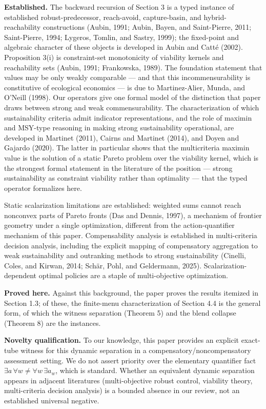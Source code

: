 \documentclass[review,11pt]{elsarticle}
\begin{document}
\textbf{Established.} The backward recursion of Section 3 is
a typed instance of established robust-predecessor, reach-avoid,
capture-basin, and hybrid-reachability constructions (Aubin, 1991;
Aubin, Bayen, and Saint-Pierre, 2011; Saint-Pierre, 1994; Lygeros,
Tomlin, and Sastry, 1999); the fixed-point and algebraic character of these objects is developed in Aubin and Catt\'e (2002). Proposition 3(i) is constraint-set
monotonicity of viability kernels and reachability sets (Aubin, 1991;
Frankowska, 1989). The foundation statement that values may be only
weakly comparable --- and that this incommensurability is constitutive
of ecological economics --- is due to Martinez-Alier, Munda, and O'Neill
(1998). Our operators give one formal model of the distinction that
paper draws between strong and weak commensurability. The
characterization of which sustainability criteria admit indicator
representations, and the role of maximin and MSY-type reasoning in
making strong sustainability operational, are developed in Martinet
(2011), Cairns and Martinet (2014), and Doyen and Gajardo (2020). The
latter in particular shows that the multicriteria maximin value is the
solution of a static Pareto problem over the viability kernel, which is
the strongest formal statement in the literature of the position ---
strong sustainability as constraint viability rather than optimality ---
that the typed operator formalizes here.

Static scalarization
limitations are established: weighted sums cannot reach nonconvex parts
of Pareto fronts (Das and Dennis, 1997), a mechanism of frontier
geometry under a single optimization, different from the
action-quantifier mechanism of this paper. Compensability analysis is
established in multi-criteria decision analysis, including the explicit
mapping of compensatory aggregation to weak sustainability and
outranking methods to strong sustainability (Cinelli, Coles, and Kirwan,
2014; Sch\"ar, Pohl, and Geldermann, 2025). Scalarization-dependent
optimal policies are a staple of multi-objective optimization.

\textbf{Proved here.} Against this background, the paper proves the results
itemized in Section 1.3; of these, the finite-menu characterization of
Section 4.4 is the general form, of which the witness separation
(Theorem 5) and the blend collapse (Theorem 8) are the instances.

\textbf{Novelty qualification.} To our knowledge, this paper provides an
explicit exact-tube witness for this dynamic separation in a
compensatory/noncompensatory assessment setting. We do not assert
priority over the elementary quantifier fact
\(\exists a\, \forall w \neq \forall w\, \exists a_w\), which is
standard. Whether an equivalent dynamic separation appears in adjacent
literatures (multi-objective robust control, viability theory,
multi-criteria decision analysis) is a bounded absence in our review,
not an established universal negative.
\end{document}

